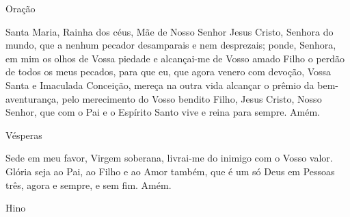 \documentclass{book}
\begin{document}
\begin{center}
    \textcolor{VioletRed2}{Oração}
\end{center}
\begin{flushleft}
    Santa Maria, Rainha dos céus, Mãe de Nosso Senhor Jesus Cristo, Senhora do mundo, que a nenhum pecador desamparais e nem desprezais; ponde, Senhora, em mim os olhos de Vossa piedade e alcançai-me de Vosso amado Filho o perdão de todos os meus pecados, para que eu, que agora venero com devoção, Vossa Santa e Imaculada Conceição, mereça na outra vida alcançar o prêmio da bem-aventurança, pelo merecimento do Vosso bendito Filho, Jesus Cristo, Nosso Senhor, que com o Pai e o Espírito Santo vive e reina para sempre. Amém.
\end{flushleft}
\newpage
\begin{center}
    Vésperas
\end{center}
\begin{flushleft}
    Sede em meu favor, Virgem soberana, livrai-me do inimigo com o Vosso valor. Glória seja ao Pai, ao Filho e ao Amor também, que é um só Deus em Pessoas três, agora e sempre, e sem fim. Amém.
\end{flushleft}
\begin{center}
    \textcolor{VioletRed2}{Hino}
\end{center}
\end{document}
